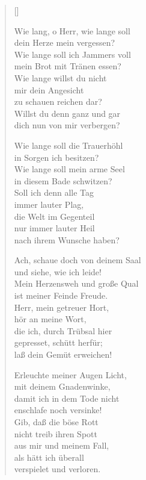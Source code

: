 \begin{multicols}{2}
\settowidth{\versewidth}{Wie lang, o Herr, wie lange soll}
\begin{verse}[\versewidth]

 Wie lang, o Herr, wie lange soll\\
dein Herze mein vergessen?\\
Wie lange soll ich Jammers voll\\
mein Brot mit Tränen essen?\\
Wie lange willst du nicht\\
mir dein Angesicht\\
zu schauen reichen dar?\\
Willst du denn ganz und gar\\
dich nun von mir verbergen?

 Wie lange soll die Trauerhöhl\\
in Sorgen ich besitzen?\\
Wie lange soll mein arme Seel\\
in diesem Bade schwitzen?\\
Soll ich denn alle Tag\\
immer lauter Plag,\\
die Welt im Gegenteil\\
nur immer lauter Heil\\
nach ihrem Wunsche haben?

 Ach, schaue doch von deinem Saal\\
und siehe, wie ich leide!\\
Mein Herzensweh und große Qual\\
ist meiner Feinde Freude.\\
Herr, mein getreuer Hort,\\
hör an meine Wort,\\
die ich, durch Trübsal hier\\
gepresset, schütt herfür;\\
laß dein Gemüt erweichen!

 Erleuchte meiner Augen Licht,\\
mit deinem Gnadenwinke,\\
damit ich in dem Tode nicht\\
enschlafe noch versinke!\\
Gib, daß die böse Rott\\
nicht treib ihren Spott\\
aus mir und meinem Fall,\\
als hätt ich überall\\
verspielet und verloren.


\end{verse}
\end{multicols}
